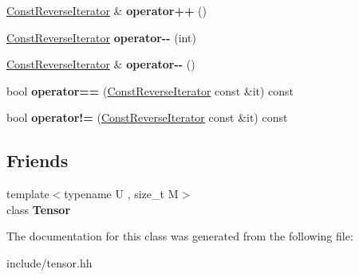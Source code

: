 \begin{DoxyCompactItemize}
\item 
\hyperlink{classtensor_1_1Tensor_1_1ConstReverseIterator}{Const\+Reverse\+Iterator} \& {\bfseries operator++} ()\hypertarget{classtensor_1_1Tensor_1_1ConstReverseIterator_aabf016da36ebbc8429c13d3a3cbfacb7}{}\label{classtensor_1_1Tensor_1_1ConstReverseIterator_aabf016da36ebbc8429c13d3a3cbfacb7}

\item 
\hyperlink{classtensor_1_1Tensor_1_1ConstReverseIterator}{Const\+Reverse\+Iterator} {\bfseries operator-\/-\/} (int)\hypertarget{classtensor_1_1Tensor_1_1ConstReverseIterator_aaeaab8ae3e89f29881036c402e46661c}{}\label{classtensor_1_1Tensor_1_1ConstReverseIterator_aaeaab8ae3e89f29881036c402e46661c}

\item 
\hyperlink{classtensor_1_1Tensor_1_1ConstReverseIterator}{Const\+Reverse\+Iterator} \& {\bfseries operator-\/-\/} ()\hypertarget{classtensor_1_1Tensor_1_1ConstReverseIterator_a23303a7f3716d92abed6a32889f94b26}{}\label{classtensor_1_1Tensor_1_1ConstReverseIterator_a23303a7f3716d92abed6a32889f94b26}

\item 
bool {\bfseries operator==} (\hyperlink{classtensor_1_1Tensor_1_1ConstReverseIterator}{Const\+Reverse\+Iterator} const \&it) const \hypertarget{classtensor_1_1Tensor_1_1ConstReverseIterator_aa89702fa0a59f3ef7396a579a30d708e}{}\label{classtensor_1_1Tensor_1_1ConstReverseIterator_aa89702fa0a59f3ef7396a579a30d708e}

\item 
bool {\bfseries operator!=} (\hyperlink{classtensor_1_1Tensor_1_1ConstReverseIterator}{Const\+Reverse\+Iterator} const \&it) const \hypertarget{classtensor_1_1Tensor_1_1ConstReverseIterator_a74b60daecf4193f06ca931902848f2d8}{}\label{classtensor_1_1Tensor_1_1ConstReverseIterator_a74b60daecf4193f06ca931902848f2d8}

\end{DoxyCompactItemize}
\subsection*{Friends}
\begin{DoxyCompactItemize}
\item 
{\footnotesize template$<$typename U , size\+\_\+t M$>$ }\\class {\bfseries Tensor}\hypertarget{classtensor_1_1Tensor_1_1ConstReverseIterator_af4a07134de1525172d3c60c57e8f1496}{}\label{classtensor_1_1Tensor_1_1ConstReverseIterator_af4a07134de1525172d3c60c57e8f1496}

\end{DoxyCompactItemize}


The documentation for this class was generated from the following file\+:\begin{DoxyCompactItemize}
\item 
include/tensor.\+hh\end{DoxyCompactItemize}
